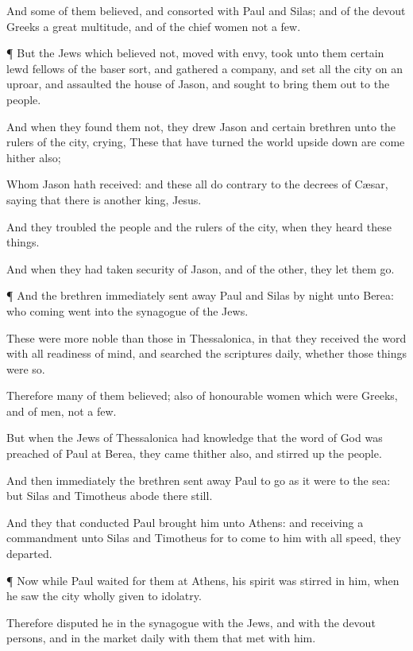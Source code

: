 {And
some
of
them
believed,
and
consorted with
Paul
and
Silas;
and of the
devout
Greeks a
great
multitude,
and of the
chief
women
not a
few.


\par }{\PP {}¶
But the
Jews
which believed
not, moved with
envy, took unto
them
certain
lewd
fellows of the baser
sort,
and gathered a
company, and set
all the
city on an
uproar,
and
assaulted the
house of
Jason, and
sought to
bring
them
out
to the
people.

And when they
found
them
not, they
drew
Jason
and
certain
brethren
unto the rulers of the
city,
crying,
These
that have
turned the
world upside
down are
come
hither
also;

Whom
Jason hath
received:
and
these
all
do
contrary to the
decrees of
Cæsar,
saying that there
is
another
king,
{}
Jesus.

And they
troubled the
people
and the rulers of the
city, when they
heard these
things.

And when they had
taken
security
of
Jason,
and of the
other, they
let
them
go.


\par }{\PP {}¶
And the
brethren
immediately sent
away
Paul
and
Silas
by
night
unto
Berea:
who
coming
{}
went
into the
synagogue of the
Jews.

These
were more
noble than
those
in
Thessalonica, in
that they
received the
word
with
all readiness of
mind, and
searched the
scriptures
daily,
whether those
things
were
so.

Therefore
many
of
them
believed;
also of
honourable
women which
were
Greeks,
and of
men,
not a
few.

But
when the
Jews
of
Thessalonica had
knowledge
that the
word of
God was
preached
of
Paul
at
Berea, they
came thither
also,
and stirred
up the
people.

And
then
immediately the
brethren sent
away
Paul to
go as it
were
to the
sea:
but
Silas
and
Timotheus
abode
there
still.

And
they that
conducted
Paul
brought
him
unto
Athens:
and
receiving a
commandment
unto
Silas
and
Timotheus
for to
come
to
him
with all
speed, they
departed.


\par }{\PP {}¶
Now while
Paul
waited for
them
at
Athens,
his
spirit was
stirred
in
him,
when he
saw the
city wholly given to
idolatry.

Therefore disputed
he
in the
synagogue with the
Jews,
and with the devout
persons,
and
in the
market
daily
with them
that met with
him.

}
